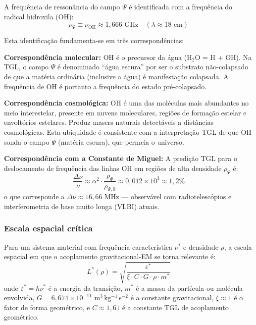 \documentclass[12pt,a4paper]{article}
\newcommand{\alphaii}{\alpha^2}
\newcommand{\rhoPsi}{\rho_\Psi}
\newcommand{\nuOH}{\nu_{\text{OH}}}
\begin{document}
A frequência de ressonância do campo $\Psi$ é identificada com
a frequência do radical hidroxila (OH):
\begin{equation}
\nu_\Psi \equiv \nuOH \approx 1{,}666 \text{ GHz}
  \quad (\lambda \approx 18 \text{ cm})
\label{eq:freq_res}
\end{equation}

Esta identificação fundamenta-se em três correspondências:

\textbf{Correspondência molecular:} OH é o precursor da água
(H$_2$O = H + OH). Na TGL, o campo $\Psi$ é denominado ``água
escura'' por ser o substrato não-colapsado de que a matéria
ordinária (inclusive a água) é manifestação colapsada. A
frequência de OH é portanto a frequência do estado
pré-colapsado.

\textbf{Correspondência cosmológica:} OH é uma das moléculas
mais abundantes no meio interestelar, presente em nuvens
moleculares, regiões de formação estelar e envoltórios
estelares. Produz masers naturais detectáveis a distâncias
cosmológicas. Esta ubiquidade é consistente com a
interpretação TGL de que OH sonda o campo $\Psi$
(matéria escura), que permeia o universo.

\textbf{Correspondência com a Constante de Miguel:} A
predição TGL para o deslocamento de frequência das linhas
OH em regiões de alta densidade $\rhoPsi$ é:
\begin{equation}
\frac{\Delta\nu}{\nu} \approx \alphaii \cdot
  \frac{\rhoPsi}{\rho_{\Psi,0}} \approx 0{,}012 \times
  10^3 \approx 1{,}2\%
\label{eq:deslocamento}
\end{equation}
o que corresponde a $\Delta\nu \approx 16{,}66$ MHz ---
observável com radiotelescópios e interferometria de base
muito longa (VLBI) atuais.

\subsubsection{Escala espacial crítica}

Para um sistema material com frequência característica
$\nu^*$ e densidade $\rho$, a escala espacial em que o
acoplamento gravitacional-EM se torna relevante é:
\begin{equation}
L^*(\rho) = \sqrt{\frac{\varepsilon^*}{\xi \cdot C \cdot
  G \cdot \rho \cdot m^*}}
\label{eq:escala}
\end{equation}
onde $\varepsilon^* = h\nu^*$ é a energia da transição,
$m^*$ é a massa da partícula ou molécula envolvida,
$G = 6{,}674 \times 10^{-11}$ m$^3$\,kg$^{-1}$\,s$^{-2}$ é a
constante gravitacional, $\xi \approx 1$ é o fator de forma
geométrico, e $C \approx 1{,}61$ é a constante TGL de
acoplamento geométrico.
\end{document}
